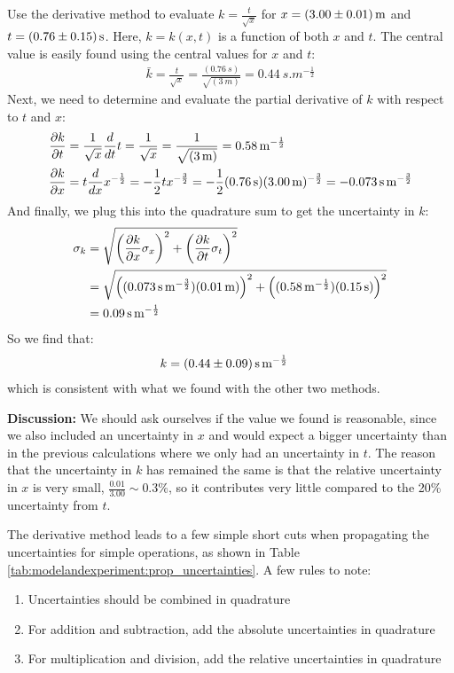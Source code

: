 \begin{example}{Use the derivative method to evaluate $k=\frac{t}{\sqrt{x}}$ for $x=\SI{3.00 \pm 0.01}{m}$ and $t=\SI{0.76\pm0.15}{s}$.}
\label{ex:modelandexperiment:derivprop}
Here, $k=k(x,t)$ is a function of both $x$ and $t$. The central value is easily found using the central values for $x$ and $t$:
\begin{align*}
\bar k = \frac{t}{\sqrt{x}} = \frac{(\SI{0.76}{s})}{\sqrt{(\SI{3}{m})}}=\SI{0.44}{s.m^{-\frac{1}{2}}}\end{align*}
Next, we need to determine and evaluate the partial derivative of $k$ with respect to $t$ and $x$:\\
\begin{align*}
\frac{\partial k}{\partial t}&=\frac{1}{\sqrt{x}}\frac{d}{dt}t=\frac{1}{\sqrt{x}}=\frac{1}{\sqrt{(\SI{3}{m})}}=\SI{0.58}{m^{-\frac{1}{2}}}\\
\frac{\partial k}{\partial x}&=t\frac{d}{dx}x^{-\frac{1}{2}}=-\frac{1}{2}tx^{-\frac{3}{2}}= -\frac{1}{2}(\SI{0.76}{s})(\SI{3.00}{m})^{-\frac{3}{2}}=-\SI{0.073}{s.m^{-\frac{3}{2}}}
\end{align*}
And finally, we plug this into the quadrature sum to get the uncertainty in $k$:\\
\begin{align*}
\sigma_k&=\sqrt{\left(\frac{\partial k}{\partial x}\sigma_x \right)^2 + \left(\frac{\partial k}{\partial t}\sigma_t \right)^2 }\\
&= \sqrt{\left((\SI{0.073}{s.m^{-\frac{3}{2}}}) (\SI{0.01}{m}) \right)^2 + \left((\SI{0.58}{m^{-\frac{1}{2}}})(\SI{0.15}{s}) \right)^2 } \\
&=\SI{0.09}{s.m^{-\frac{1}{2}}}
\end{align*}
So we find that:
\begin{align*}
k&= \SI{0.44 \pm 0.09}{s.m^{-\frac{1}{2}}}
\end{align*}
which is consistent with what we found with the other two methods.

\textbf{Discussion:} We should ask ourselves if the value we found is reasonable, since we also included an uncertainty in $x$ and would expect a bigger uncertainty than in the previous calculations where we only had an uncertainty in $t$. The reason that the uncertainty in $k$ has remained the same is that the relative uncertainty in $x$ is very small, $\frac{0.01}{3.00}\sim 0.3\%$, so it contributes very little compared to the 20\% uncertainty from $t$. 
\end{example}

The derivative method leads to a few simple short cuts when propagating the uncertainties for simple operations, as shown in Table \ref{tab:modelandexperiment:prop_uncertainties}. A few rules to note:
\begin{enumerate}
\item Uncertainties should be combined in quadrature
\item For addition and subtraction, add the absolute uncertainties in quadrature
\item For multiplication and division, add the relative uncertainties in quadrature
\end{enumerate}

